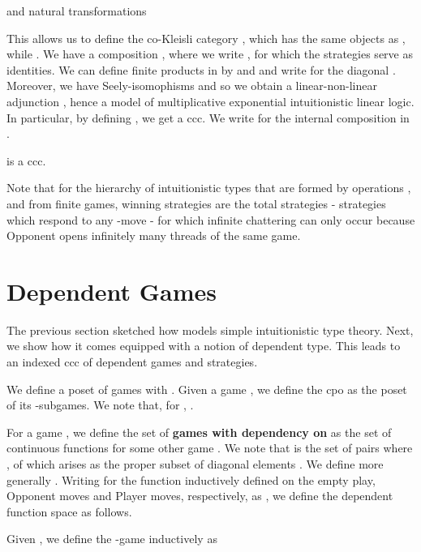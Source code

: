 \documentclass[runningheads,a4paper]{llncs}
\renewcommand{\emph}[1]{\textbf{#1}}
\begin{document}
and natural transformations \vspace{-8pt} 

This allows us to define the co-Kleisli category , which has the same objects as , while . We have a composition , where we write , for which the strategies  serve as identities. We can define finite products in  by  and  and write\vspace{-5pt}\newline {} for the diagonal . Moreover, we have Seely-isomophisms  and  so we obtain a linear-non-linear adjunction , hence a model of multiplicative exponential intuitionistic linear logic. In particular, by defining , we get a ccc. We write  for the internal composition  in .
\begin{theorem} is a ccc.\end{theorem}
Note that for the hierarchy of intuitionistic types  that are formed by operations ,  and  from finite games,  winning strategies are the total strategies - strategies which respond to any -move - for which infinite chattering can only occur because Opponent opens infinitely many threads of the same game.
 \vspace{-5pt}

\section{Dependent Games}\label{sec:depgam}\vspace{-7pt}
The previous section sketched how  models simple intuitionistic type theory. Next, we show how it comes equipped with a notion of dependent type. This leads to an indexed ccc  of dependent games and strategies.

We define a poset  of games with . Given a game , we define the cpo  as the poset of its -subgames. We note that, for , .


For a game , we define the set  of \emph{games with dependency on } as the set of continuous functions  for some other game .  We note that  is the set of pairs  where , of which  arises as the proper subset of diagonal elements . We define more generally . Writing  for the function  inductively defined on the empty play, Opponent moves and Player moves, respectively, as  , we define the dependent function space as follows.
\begin{definition}[-Game]
Given , we define the -game   inductively as \\
\resizebox{\linewidth}{!}{\parbox{\linewidth}{\vspace{-10pt}
}}
\vspace{-5pt}
\end{definition}\vspace{-12pt}
\end{document}
